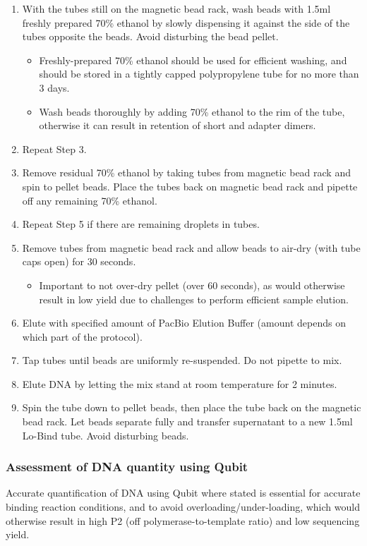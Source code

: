\begin{enumerate}
\begin{itemize}
	\end{itemize}
	\item With the tubes still on the magnetic bead rack, wash beads with 1.5ml freshly prepared 70\% ethanol by slowly dispensing it against the side of the tubes opposite the beads. Avoid disturbing the bead pellet.
	\begin{itemize}
		\item Freshly-prepared 70\% ethanol should be used for efficient washing, and should be stored in a tightly capped polypropylene tube for no more than 3 days.
		\item Wash beads thoroughly by adding 70\% ethanol to the rim of the tube, otherwise it can result in retention of short and adapter dimers.
	\end{itemize} 	
	\item Repeat Step 3. 
	\item Remove residual 70\% ethanol by taking tubes from magnetic bead rack and spin to pellet beads. Place the tubes back on magnetic bead rack and pipette off any remaining 70\% ethanol.
	\item Repeat Step 5 if there are remaining droplets in tubes. 
	\item Remove tubes from magnetic bead rack and allow beads to air-dry (with tube caps open) for 30 seconds.
	\begin{itemize}
		\item Important to not over-dry pellet (over 60 seconds), as would otherwise result in low yield due to challenges to perform efficient sample elution. 
	\end{itemize}
	\item Elute with specified amount of PacBio Elution Buffer (amount depends on which part of the protocol).
	\item Tap tubes until beads are uniformly re-suspended. Do not pipette to mix.
	\item Elute DNA by letting the mix stand at room temperature for 2 minutes.
	\item Spin the tube down to pellet beads, then place the tube back on the magnetic bead rack. Let beads separate fully and transfer supernatant to a new 1.5ml Lo-Bind tube. Avoid disturbing beads. 
\end{enumerate}


\subsubsection{Assessment of DNA quantity using Qubit}
Accurate quantification of DNA using Qubit where stated is essential for accurate binding reaction conditions, and to avoid overloading/under-loading, which would otherwise result in high P2 (off polymerase-to-template ratio) and low sequencing yield. 


